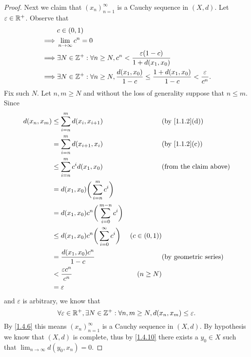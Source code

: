 \begin{proof}
  Next we claim that \((x_n)_{n = 1}^\infty\) is a Cauchy sequence in \((X, d)\).
  Let \(\varepsilon \in \mathbb{R}^+\).
  Observe that
  \begin{align*}
             & c \in (0, 1)                                                                                                                      \\
    \implies & \lim_{n \to \infty} c^n = 0                                                                                                       \\
    \implies & \exists N \in \mathbb{Z}^+ : \forall n \geq N, c^n < \dfrac{\varepsilon (1 - c)}{1 + d(x_1, x_0)}                                         \\
    \implies & \exists N \in \mathbb{Z}^+ : \forall n \geq N, \dfrac{d(x_1, x_0)}{1 - c} \leq \dfrac{1 + d(x_1, x_0)}{1 - c} < \dfrac{\varepsilon}{c^n}.
  \end{align*}
  Fix such \(N\).
  Let \(n, m \geq N\) and without the loss of generality suppose that \(n \leq m\).
  Since
  \begin{align*}
    d(x_n, x_m) & \leq \sum_{i = n}^m d(x_i, x_{i + 1})                    &                & \text{(by \cref{1.1.2}(d))}   \\
                & = \sum_{i = n}^m d(x_{i + 1}, x_i)                       &                & \text{(by \cref{1.1.2}(c))}   \\
                & \leq \sum_{i = n}^m c^i d(x_1, x_0)                      &                & \text{(from the claim above)} \\
                & = d(x_1, x_0) \bigg(\sum_{i = n}^m c^i\bigg)                                                              \\
                & = d(x_1, x_0) c^n \bigg(\sum_{i = 0}^{m - n} c^i\bigg)                                                    \\
                & \leq d(x_1, x_0) c^n \bigg(\sum_{i = 0}^\infty c^i\bigg) & (c \in (0, 1))                                 \\
                & = \dfrac{d(x_1, x_0) c^n}{1 - c}                         &                & \text{(by geometric series)}  \\
                & < \dfrac{\varepsilon c^n}{c^n}                           & (n \geq N)                                     \\
                & = \varepsilon
  \end{align*}
  and \(\varepsilon\) is arbitrary, we know that
  \[
    \forall \varepsilon \in \mathbb{R}^+, \exists N \in \mathbb{Z}^+ : \forall n, m \geq N, d(x_n, x_m) \leq \varepsilon.
  \]
  By \cref{1.4.6} this means \((x_n)_{n = 1}^\infty\) is a Cauchy sequence in \((X, d)\).
  By hypothesis we know that \((X, d)\) is complete, thus by \cref{1.4.10} there exists a \(y_0 \in X\) such that \(\lim_{n \to \infty} d(y_0, x_n) = 0\).


\end{proof}
